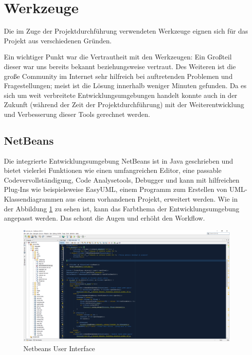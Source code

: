 	\newpage
	\section{Werkzeuge}
	Die im Zuge der Projektdurchführung verwendeten Werkzeuge eignen sich für das Projekt aus verschiedenen Gründen.
	
	Ein wichtiger Punkt war die Vertrautheit mit den Werkzeugen: Ein Großteil dieser war uns bereits bekannt beziehungsweise vertraut. Des Weiteren ist die große Community im Internet sehr hilfreich bei auftretenden Problemen und Fragestellungen; meist ist die Lösung innerhalb weniger Minuten gefunden. Da es sich um weit verbreitete Entwicklungsumgebungen handelt konnte auch in der Zukunft (während der Zeit der Projektdurchführung) mit der Weiterentwicklung und Verbesserung dieser Tools gerechnet werden.
	
	\subsection{NetBeans}
	Die integrierte Entwicklungsumgebung NetBeans ist in Java geschrieben und bietet vielerlei Funktionen wie einen umfangreichen Editor, eine passable Codevervollständigung, Code Analysetools, Debugger und kann mit hilfreichen Plug-Ins wie beispielsweise EasyUML, einem Programm zum Erstellen von UML-Klassendiagrammen aus einem vorhandenen Projekt, erweitert werden. Wie in der Abbildung \ref{Netbeans_GUI} zu sehen ist, kann das Farbthema der Entwicklungsumgebung angepasst werden. Das schont die Augen und erhöht den Workflow.
	
	\begin{figure}[h]
		\centering
		\includegraphics[scale=.3]{figures/netbeans_gui.png}
		\caption{Netbeans User Interface}
		\label{Netbeans_GUI}
	\end{figure}
	
